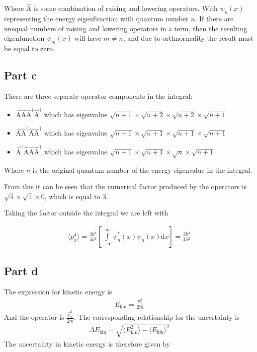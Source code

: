 \documentclass[paper=a4, fontsize=11pt]{scrartcl} %
\numberwithin{equation}{section} %
\numberwithin{figure}{section} %
\numberwithin{table}{section} %
\begin{document}
Where $\hat{\textrm{A}}$ is some combination of raising and lowering operators. With $\psi_n(x)$ representing the energy eigenfunction with quantum number $n$. If there are unequal numbers of raising and lowering operators in a term, then the resulting eigenfunction $\psi_m(x)$ will have $m \neq n$, and due to orthnormality the result must be equal to zero.

\subsection{Part c}
There are three separate operator components in the integral:\begin{itemize}
\item{
 $\hat{\textrm{A}}\hat{\textrm{A}}
\hat{\textrm{A}}^{\dagger}\hat{\textrm{A}}^{\dagger}$
which has eigenvalue $\sqrt{n+1}\times \sqrt{n+2}\times \sqrt{n+2}\times \sqrt{n+1}$}
\item{
$\hat{\textrm{A}}\hat{\textrm{A}}^{\dagger}
\hat{\textrm{A}}\hat{\textrm{A}}^{\dagger}$
which has eigenvalue $\sqrt{n+1}\times \sqrt{n+1}\times \sqrt{n+1}\times \sqrt{n+1}$}
\item{
$\hat{\textrm{A}}^{\dagger}\hat{\textrm{A}}
\hat{\textrm{A}}\hat{\textrm{A}}^{\dagger}$
which has eigenvalue $\sqrt{n+1}\times \sqrt{n+1}\times \sqrt{n}\times \sqrt{n+1}$}

\end{itemize}


Where $n$ is the original quantum number of the energy eigenvalue in the integral.


From this it can be seen that the numerical factor produced by the operators is $\sqrt{4} \times \sqrt{1} \times 0$, which is equal to $3$.

Taking the factor outside the integral we are left with

\begin{align}
\langle p^4_x \rangle = \frac{3\hbar^4}{4a^4}
\left[\int\limits_{-\infty}^{\infty}\psi^*_n\left(x\right) \psi_n\left(x\right) \mathrm{d}x \right] = \frac{3\hbar^4}{4a^2}
\end{align}

\subsection{Part d}
The expression for kinetic energy is
\begin{align}
E_{\textrm{kin}} = \frac{p^2_x}{2m}
\end{align}
And the operator is $\frac{\hat{p}^2_x}{2m}$. The corresponding relationship for the uncertainty is
\begin{align}
\Delta E_{\textrm{kin}} = \sqrt{\langle E_{\textrm{kin}}^2\rangle - \langle E_{\textrm{kin}}\rangle^2}
\end{align}
The uncertainty in kinetic energy is therefore given by
\end{document}
